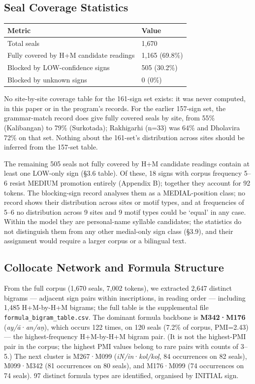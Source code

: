 \documentclass[11pt]{article}
\newcounter{none} %
\begin{document}
\subsection{Seal Coverage
Statistics}\label{seal-coverage-statistics}

{\def\LTcaptype{none} %
\begin{longtable}[]{@{}ll@{}}
\toprule\noalign{}
Metric & Value \\
\midrule\noalign{}
\endhead
\bottomrule\noalign{}
\endlastfoot
Total seals & 1,670 \\
Fully covered by H+M candidate readings & 1,165 (69.8\%) \\
Blocked by LOW-confidence signs & 505 (30.2\%) \\
Blocked by unknown signs & 0 (0\%) \\
\end{longtable}
}

No site-by-site coverage table for the 161-sign set exists: it was never computed, in this paper or in the program's records. For the earlier 157-sign set, the grammar-match record does give fully covered seals by site, from 55\% (Kalibangan) to 79\% (Surkotada); Rakhigarhi (n=33) was 64\% and Dholavira 72\% on that set. Nothing about the 161-set's distribution across sites should be inferred from the 157-set table.

The remaining 505 seals not fully covered by H+M candidate readings contain at least one LOW-only sign (§3.6 table). Of these, 18 signs with corpus frequency 5--6 resist MEDIUM promotion entirely (Appendix B); together they account for 92 tokens. The blocking-sign record analyses them as a MEDIAL-position class; no record shows their distribution across sites or motif types, and at frequencies of 5--6 no distribution across 9 sites and 9 motif types could be `equal' in any case. Within the model they are personal-name syllable candidates; the statistics do not distinguish them from any other medial-only sign class (§3.9), and their assignment would require a larger corpus or a bilingual text.

\subsection{Collocate Network and Formula Structure
}\label{collocate-network-and-formula-structure-phase-142}

From the full corpus (1,670 seals, 7,002 tokens), we extracted 2,647 distinct bigrams --- adjacent sign pairs within inscriptions, in reading order --- including 1,485 H+M-by-H+M bigrams; the full table is the supplemental file \texttt{formula\_bigram\_table.csv}. The dominant formula backbone is \textbf{M342·M176} (\emph{ay/ā}·\emph{an/aṇ}), which occurs 122 times, on 120 seals (7.2\% of corpus, PMI=2.43) --- the highest-frequency H+M-by-H+M bigram pair. (It is not the highest-PMI pair in the corpus; the highest PMI values belong to rare pairs with counts of 3--5.) The next cluster is M267·M099
(\emph{iN/in}·\emph{kol/koḷ}, 84 occurrences on 82 seals), M099·M342 (81 occurrences on 80 seals), and
M176·M099 (74 occurrences on 74 seals). 97 distinct formula types are identified, organised by INITIAL sign.
\end{document}

